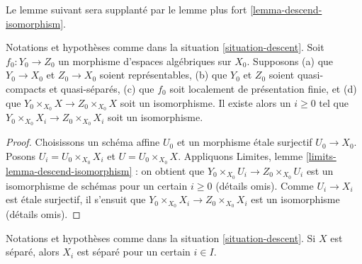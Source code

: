 \noindent
Le lemme suivant sera supplanté par le lemme plus fort
\ref{lemma-descend-isomorphism}.

\begin{lemma}
\label{lemma-descend-equality}
Notations et hypothèses comme dans la situation \ref{situation-descent}.
Soit $f_0 : Y_0 \to Z_0$ un morphisme d'espaces algébriques sur $X_0$.
Supposons (a) que $Y_0 \to X_0$ et $Z_0 \to X_0$ soient représentables, (b) que
$Y_0$ et $Z_0$ soient quasi-compacts et quasi-séparés, (c) que
$f_0$ soit localement de présentation finie, et
(d) que $Y_0 \times_{X_0} X \to Z_0 \times_{X_0} X$ soit un isomorphisme.
Il existe alors un $i \geq 0$ tel que
$Y_0 \times_{X_0} X_i \to Z_0 \times_{X_0} X_i$ soit un isomorphisme.
\end{lemma}

\begin{proof}
Choisissons un schéma affine $U_0$ et un morphisme étale surjectif $U_0 \to X_0$.
Posons $U_i = U_0 \times_{X_0} X_i$ et $U = U_0 \times_{X_0} X$.
Appliquons Limites, lemme \ref{limits-lemma-descend-isomorphism} :
on obtient que $Y_0 \times_{X_0} U_i \to Z_0 \times_{X_0} U_i$
est un isomorphisme de schémas pour un certain $i \geq 0$ (détails omis).
Comme $U_i \to X_i$ est étale surjectif, il s'ensuit que
$Y_0 \times_{X_0} X_i \to Z_0 \times_{X_0} X_i$ est un isomorphisme
(détails omis).
\end{proof}

\begin{lemma}
\label{lemma-descend-separated}
Notations et hypothèses comme dans la situation \ref{situation-descent}.
Si $X$ est séparé, alors $X_i$ est séparé pour un certain $i \in I$.
\end{lemma}

